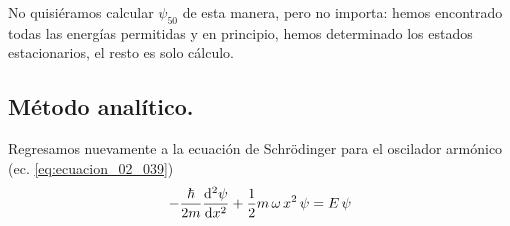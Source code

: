 No quisiéramos calcular $\psi_{50}$ de esta manera, pero no importa: hemos encontrado todas las energías permitidas y en principio, hemos determinado los estados estacionarios, el resto es solo cálculo.

\subsection{Método analítico.}

Regresamos nuevamente a la ecuación de Schrödinger para el oscilador armónico (ec. \ref{eq:ecuacion_02_039})
\begin{align*}
- \dfrac{\hbar}{2 m} \dv[2]{\psi}{x} + \dfrac{1}{2} m \, \omega \, x^{2} \, \psi = E \, \psi  
\end{align*}

